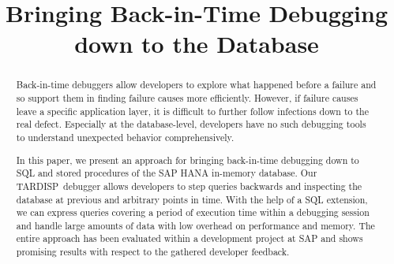 \documentclass[english,conference]{IEEEtran}
\newcommand{\tool}{TAR\-DISP}
\begin{document}
\title{Bringing Back-in-Time Debugging down to the Database}

\author{
\and
{}
\and
{}
}




\maketitle
\begin{abstract}
Back-in-time debuggers allow developers to explore what happened before a failure and so support them in finding failure causes more efficiently. 
However, if failure causes leave a specific application layer, it is difficult to further follow infections down to the real defect.
Especially at the database-level, developers have no such debugging tools to understand unexpected behavior comprehensively.

In this paper, we present an approach for bringing back-in-time debugging down to SQL and stored procedures of the SAP HANA in-memory database.
Our \tool\ debugger allows developers to step queries backwards and inspecting the database at previous and arbitrary points in time.
With the help of a SQL extension, we can express queries covering a period of execution time within a debugging session and handle large amounts of data with low overhead on performance and memory.
The entire approach has been evaluated within a development project at SAP and shows promising results with respect to the gathered developer feedback.
\end{abstract}
\end{document}
